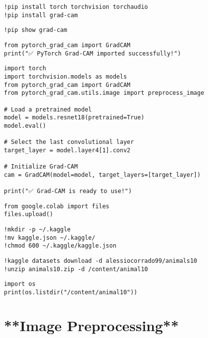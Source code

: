 \documentclass{article}
\begin{document}
\begin{verbatim}
!pip install torch torchvision torchaudio
!pip install grad-cam

\end{verbatim}

\begin{verbatim}
!pip show grad-cam

\end{verbatim}

\begin{verbatim}
from pytorch_grad_cam import GradCAM
print("✅ PyTorch Grad-CAM imported successfully!")

\end{verbatim}

\begin{verbatim}
import torch
import torchvision.models as models
from pytorch_grad_cam import GradCAM
from pytorch_grad_cam.utils.image import preprocess_image

# Load a pretrained model
model = models.resnet18(pretrained=True)
model.eval()

# Select the last convolutional layer
target_layer = model.layer4[1].conv2

# Initialize Grad-CAM
cam = GradCAM(model=model, target_layers=[target_layer])

print("✅ Grad-CAM is ready to use!")

\end{verbatim}

\begin{verbatim}
from google.colab import files
files.upload()
\end{verbatim}

\begin{verbatim}
!mkdir -p ~/.kaggle
!mv kaggle.json ~/.kaggle/
!chmod 600 ~/.kaggle/kaggle.json
\end{verbatim}

\begin{verbatim}
!kaggle datasets download -d alessiocorrado99/animals10
!unzip animals10.zip -d /content/animal10
\end{verbatim}

\begin{verbatim}
import os
print(os.listdir("/content/animal10"))
\end{verbatim}

\section{**Image Preprocessing**}
\end{document}
